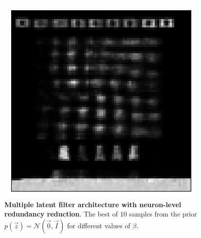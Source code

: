 \begin{figure}[h!]
\begin{multicols}{3}
    \includegraphics[scale=0.4]{figures/results/indiscriminate_decoupling/beta_32_prior_sample_3.png}
    \caption{$\beta=32$}
\end{multicols}
\caption{\textbf{Multiple latent filter architecture with neuron-level redundancy reduction}. The best of $10$ samples from the prior $p(\vec{z}) = \mathcal{N}(\vec{0}, \vec{I})$ for different values of $\beta$.}
\label{fig:indiscriminate_decoupling_prior_samples}
\end{figure}


